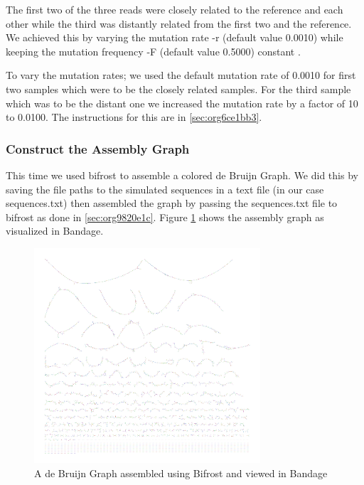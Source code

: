 \documentclass[10pt, a4paper]{article}
\begin{document}
The first two of the three reads were closely related to the reference and each
other while the third was distantly related from the first two and the
reference.
We achieved this by varying the mutation rate -r (default value 0.0010) while 
keeping the mutation frequency -F (default value 0.5000) constant
\cite{greenSuggestionsConcerningRelationship1995}.

To vary the mutation rates; we used the default mutation rate of 0.0010 for
first two samples which were to be the closely related samples. 
For the third sample which was to be the distant one we increased the mutation 
rate by a factor of 10 to 0.0100. 
The instructions for this are in \ref{sec:org6ce1bb3}.

\subsubsection{Construct the Assembly Graph}
\label{sec:orgb0c226e}
This time we used bifrost \cite{holleyBifrostHighlyParallel2019} to assemble a
colored de Bruijn Graph. 
We did this by saving the file paths to the simulated sequences in a text file
(in our case sequences.txt) then assembled the graph by passing the 
sequences.txt file to bifrost as done in \ref{sec:org9820e1c}.
Figure \ref{fig:orgd26ca56} shows the assembly graph as visualized in Bandage.

\begin{figure}[h]
\centering
\includegraphics[width=0.75\textwidth]{../Figures/SARS_CoV_2/SARS_Assembly_Graph.png}
\caption[SARS-CoV-2 Assembly Graph]{\label{fig:orgd26ca56}
A de Bruijn Graph assembled using Bifrost and viewed in Bandage}
\end{figure}
\end{document}
